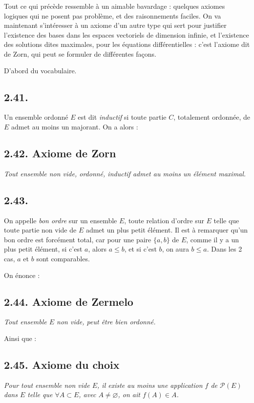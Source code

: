 
Tout ce qui précède ressemble à un aimable bavardage : quelques axiomes logiques qui ne posent pas problème, et des raisonnements faciles. On va maintenant s'intéresser à un axiome d'un autre type qui sert  pour justifier l'existence des bases dans les espaces vectoriels de dimension infinie, et l'existence des solutions dites maximales, pour les équations différentielles : c'est l'axiome dit de Zorn, qui peut se formuler de différentes façons.

D'abord du vocabulaire.

\subsection*{2.41.}
Un ensemble ordonné $E$ est dit \emph{inductif} si toute partie $C$, totalement ordonnée, de $E$ admet au moins un majorant. On a alors :

\subsection*{2.42. Axiome de Zorn}
\emph{Tout ensemble non vide, ordonné, inductif admet au moins un élément maximal.}

\subsection*{2.43.}
On appelle \emph{bon ordre} sur un ensemble $E$, toute relation d'ordre sur $E$ telle que toute partie non vide de $E$ admet un plus petit élément. Il est à remarquer qu'un bon ordre est forcément total, car pour une paire $\{a,b\}$ de $E$, comme il y a un plus petit élément, si c'est $a$, alors $a\le b$, et si c'est $b$, on aura $b\le a$. Dans les 2 cas, $a$ et $b$ sont comparables.

On énonce :

\subsection*{2.44. Axiome de Zermelo}
\emph{Tout ensemble $E$ non vide, peut être bien ordonné.}

Ainsi que :

\subsection*{2.45. Axiome du choix}
\emph{Pour tout ensemble non vide $E$, il existe au moins une application $f$ de $\mathcal P(E)$ dans $E$ telle que $\forall A\subset E$, avec $A\ne\varnothing$, on ait $f(A)\in A$.}

